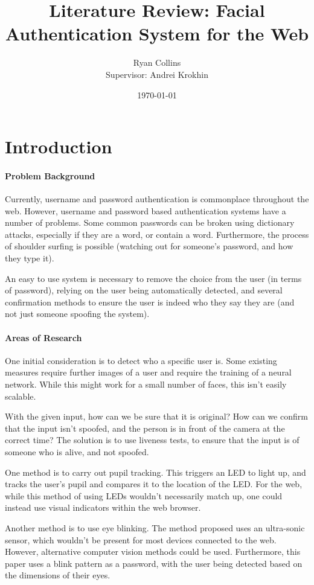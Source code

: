 \documentclass[14pt]{article}
\title{Literature Review: Facial Authentication System for the Web}
\author{
        Ryan Collins\\
        Supervisor: Andrei Krokhin
}
\date{\today}
\begin{document}
\maketitle

\section{Introduction}
\paragraph{Problem Background}
Currently, username and password authentication is commonplace throughout the web. However, username and password
based authentication systems have a number of problems. Some common passwords can be broken using dictionary attacks,
especially if they are a word, or contain a word. Furthermore, the process of shoulder surfing is possible (watching out
for someone's password, and how they type it).

An easy to use system is necessary to remove the choice from the user (in terms of password), relying on the user being automatically
detected, and several confirmation methods to ensure the user is indeed who they say they are (and not just someone spoofing the system).

\paragraph{Areas of Research}
One initial consideration is to detect who a specific user is. Some existing measures require further images of a user
and require the training of a neural network. While this might work for a small number of faces, this isn't easily scalable.

With the given input, how can we be sure that it is original? How can we confirm that the input isn't spoofed,
and the person is in front of the camera at the correct time? The solution is to use liveness tests, to ensure
that the input is of someone who is alive, and not spoofed. 

One method is to carry out pupil tracking. This triggers an LED to light up, and tracks the user's pupil and
compares it to the location of the LED.
\cite{LivenessTestPupilTracking} For the web, while this method of using LEDs wouldn't necessarily match up,
one could instead use visual indicators within the web browser. 

Another method is to use eye blinking. The method proposed uses an ultra-sonic sensor,
which wouldn't be present for most devices connected to the web. However, alternative computer vision methods could be used.
Furthermore, this paper uses a blink pattern as a password, with the user being detected based on the dimensions of their eyes.\cite{LivenessTestBlinking}
\end{document}
